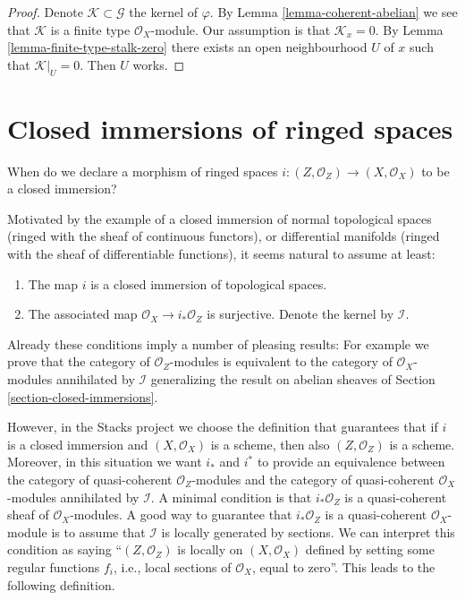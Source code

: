 \begin{proof}
Denote $\mathcal{K} \subset \mathcal{G}$ the kernel of $\varphi$.
By Lemma \ref{lemma-coherent-abelian} we see that $\mathcal{K}$ is
a finite type $\mathcal{O}_X$-module. Our assumption is that
$\mathcal{K}_x = 0$. By Lemma \ref{lemma-finite-type-stalk-zero}
there exists an open neighbourhood $U$ of $x$ such that $\mathcal{K}|_U = 0$.
Then $U$ works.
\end{proof}













\section{Closed immersions of ringed spaces}
\label{section-closed-immersion}

\noindent
When do we declare a morphism of ringed spaces
$i : (Z, \mathcal{O}_Z) \to (X, \mathcal{O}_X)$
to be a closed immersion?

\medskip\noindent
Motivated by the example of a closed immersion of normal topological spaces
(ringed with the sheaf of continuous functors), or differential manifolds
(ringed with the sheaf of differentiable functions), it seems natural to
assume at least:
\begin{enumerate}
\item The map $i$ is a closed immersion of topological spaces.
\item The associated map $\mathcal{O}_X \to i_*\mathcal{O}_Z$
is surjective. Denote the kernel by $\mathcal{I}$.
\end{enumerate}
Already these conditions imply a number of pleasing results: For example
we prove that the category of $\mathcal{O}_Z$-modules is equivalent to
the category of $\mathcal{O}_X$-modules annihilated by $\mathcal{I}$
generalizing the result on abelian sheaves of
Section \ref{section-closed-immersions}.

\medskip\noindent
However, in the Stacks project we choose the
definition that guarantees that if $i$ is a closed immersion
and $(X, \mathcal{O}_X)$ is a scheme, then also $(Z, \mathcal{O}_Z)$
is a scheme. Moreover, in this situation we want $i_*$ and $i^*$
to provide an equivalence between the category of quasi-coherent
$\mathcal{O}_Z$-modules and the category of quasi-coherent
$\mathcal{O}_X$-modules annihilated by $\mathcal{I}$.
A minimal condition is that $i_*\mathcal{O}_Z$ is a
quasi-coherent sheaf of $\mathcal{O}_X$-modules.
A good way to guarantee that $i_*\mathcal{O}_Z$ is a
quasi-coherent $\mathcal{O}_X$-module is to assume that
$\mathcal{I}$ is locally generated by sections.
We can interpret this condition as saying ``$(Z, \mathcal{O}_Z)$ is
locally on $(X, \mathcal{O}_X)$ defined by setting some regular functions
$f_i$, i.e., local sections of $\mathcal{O}_X$, equal to zero''.
This leads to the following definition.

